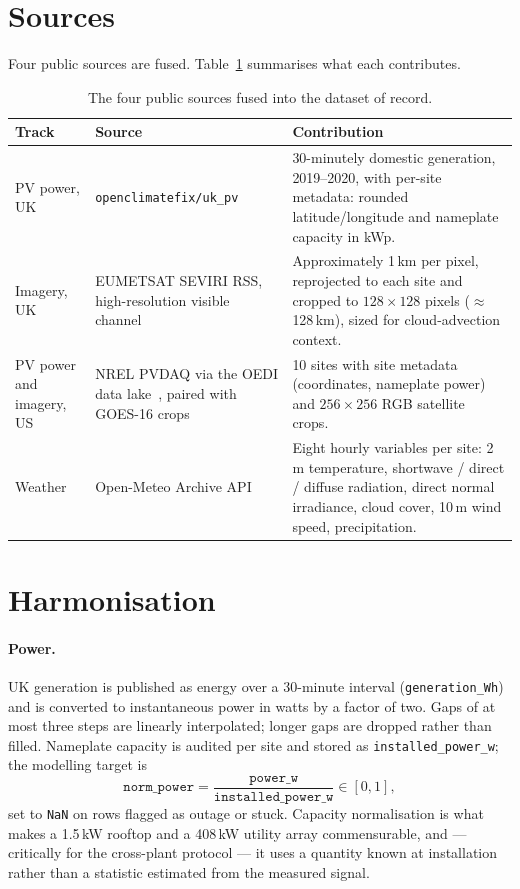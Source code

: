 \section{Sources}
\label{sec:sources}

Four public sources are fused. Table~\ref{tab:sources} summarises what each contributes.

\begin{table}[h!]
\centering
\small
\begin{tabular}{p{2.6cm} p{4.4cm} p{6.2cm}}
\hline
\textbf{Track} & \textbf{Source} & \textbf{Contribution} \\
\hline
PV power, UK & \texttt{openclimatefix/uk\_pv}~\cite{ukpv} & 30-minutely domestic
generation, 2019--2020, with per-site metadata: rounded latitude/longitude and nameplate
capacity in kWp. \\
Imagery, UK & EUMETSAT SEVIRI RSS, high-resolution visible channel~\cite{eumetsat} &
Approximately 1\,km per pixel, reprojected to each site and cropped to
$128\times128$ pixels ($\approx$128\,km), sized for cloud-advection context. \\
PV power and imagery, US & NREL PVDAQ via the OEDI data lake~\cite{pvdaq}, paired with
GOES-16 crops & 10 sites with site metadata (coordinates, nameplate power) and
$256\times256$ RGB satellite crops. \\
Weather & Open-Meteo Archive API~\cite{openmeteo} & Eight hourly variables per site:
2\,m temperature, shortwave / direct / diffuse radiation, direct normal irradiance, cloud
cover, 10\,m wind speed, precipitation. \\
\hline
\end{tabular}
\caption{The four public sources fused into the dataset of record.}
\label{tab:sources}
\end{table}

\section{Harmonisation}
\label{sec:harmonisation}

\paragraph{Power.} UK generation is published as energy over a 30-minute interval
(\texttt{generation\_Wh}) and is converted to instantaneous power in watts by a factor of
two. Gaps of at most three steps are linearly interpolated; longer gaps are dropped rather
than filled. Nameplate capacity is audited per site and stored as
\texttt{installed\_power\_w}; the modelling target is
\[
  \texttt{norm\_power} = \frac{\texttt{power\_w}}{\texttt{installed\_power\_w}} \in [0,1],
\]
set to \texttt{NaN} on rows flagged as outage or stuck. Capacity normalisation is what makes
a 1.5\,kW rooftop and a 408\,kW utility array commensurable, and --- critically for the
cross-plant protocol --- it uses a quantity known at installation rather than a statistic
estimated from the measured signal.

